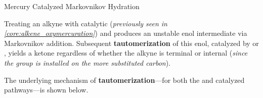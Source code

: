 \documentclass[10pt]{article}
\begin{document}
      \begin{core}[label=core:merc_mark_hydra]{Mercury Catalyzed Markovnikov Hydration}

        Treating an alkyne with catalytic  (\textit{previously seen in \autoref{core:alkene_oxymercuration}}) and  produces an unstable enol intermediate via Markovnikov addition. Subsequent \textbf{tautomerization} of this enol, catalyzed by  or , yields a ketone regardless of whether the alkyne is terminal or internal (\textit{since the  group is installed on the more substituted carbon}).


        The underlying mechanism of \textbf{tautomerization}---for both the  and  catalyzed pathways---is shown below.


\end{core}
\end{document}
